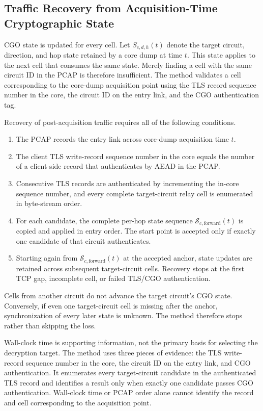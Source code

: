 \documentclass[10pt,a4paper]{article}
\begin{document}
\subsection{Traffic Recovery from Acquisition-Time Cryptographic State}

CGO state is updated for every cell. Let $S_{c,d,h}(t)$ denote the target circuit, direction, and hop state retained by a core dump at time $t$. This state applies to the next cell that consumes the same state. Merely finding a cell with the same circuit ID in the PCAP is therefore insufficient. The method validates a cell corresponding to the core-dump acquisition point using the TLS record sequence number in the core, the circuit ID on the entry link, and the CGO authentication tag.

Recovery of post-acquisition traffic requires all of the following conditions.

\begin{enumerate}
  \item The PCAP records the entry link across core-dump acquisition time $t$.
  \item The client TLS write-record sequence number in the core equals the number of a client-side record that authenticates by AEAD in the PCAP.
  \item Consecutive TLS records are authenticated by incrementing the in-core sequence number, and every complete target-circuit relay cell is enumerated in byte-stream order.
  \item For each candidate, the complete per-hop state sequence $\mathcal{S}_{c,\mathrm{forward}}(t)$ is copied and applied in entry order. The start point is accepted only if exactly one candidate of that circuit authenticates.
  \item Starting again from $\mathcal{S}_{c,\mathrm{forward}}(t)$ at the accepted anchor, state updates are retained across subsequent target-circuit cells. Recovery stops at the first TCP gap, incomplete cell, or failed TLS/CGO authentication.
\end{enumerate}

Cells from another circuit do not advance the target circuit's CGO state. Conversely, if even one target-circuit cell is missing after the anchor, synchronization of every later state is unknown. The method therefore stops rather than skipping the loss.

Wall-clock time is supporting information, not the primary basis for selecting the decryption target. The method uses three pieces of evidence: the TLS write-record sequence number in the core, the circuit ID on the entry link, and CGO authentication. It enumerates every target-circuit candidate in the authenticated TLS record and identifies a result only when exactly one candidate passes CGO authentication. Wall-clock time or PCAP order alone cannot identify the record and cell corresponding to the acquisition point.
\end{document}
